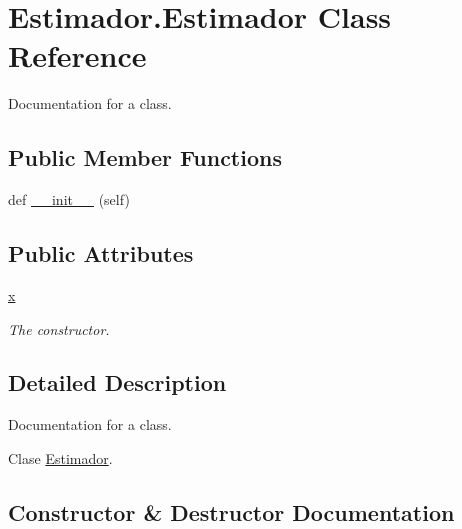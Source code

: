 \hypertarget{class_estimador_1_1_estimador}{}\section{Estimador.\+Estimador Class Reference}
\label{class_estimador_1_1_estimador}


Documentation for a class.  


\subsection*{Public Member Functions}
\begin{DoxyCompactItemize}
\item 
def \mbox{\hyperlink{class_estimador_1_1_estimador_a8bf8fee53f139aedc3729cfb6cba6b8f}{\+\_\+\+\_\+init\+\_\+\+\_\+}} (self)
\end{DoxyCompactItemize}
\subsection*{Public Attributes}
\begin{DoxyCompactItemize}
\item 
\mbox{\hyperlink{class_estimador_1_1_estimador_a998588ba815fd0c90fb8abbcf9456693}{x}}
\begin{DoxyCompactList}\small\item\em The constructor. \end{DoxyCompactList}\end{DoxyCompactItemize}


\subsection{Detailed Description}
Documentation for a class. 

Clase \mbox{\hyperlink{class_estimador_1_1_estimador}{Estimador}}. 

\subsection{Constructor \& Destructor Documentation}
\mbox{\label{class_estimador_1_1_estimador_a8bf8fee53f139aedc3729cfb6cba6b8f}} 

